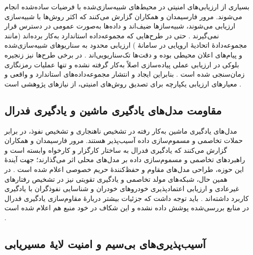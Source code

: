 \documentclass[12pt,a4paper]{article}
\begin{document}
بسیاری از ارزیابی‌های امنیتی در محیط‌های شبیه‌سازی‌شده با فرضیات ساده‌شده انجام می‌شوند. مرور فارسیمدان و همکاران گزارش می‌کنند که اکثر روش‌ها با شبیه‌سازی ارزیابی می‌شوند، شبیه‌سازها ضیف‌اند و داده‌ها به‌صورت عمومی در دسترس قرار نمی‌گیرند \cite{farsimadanReviewSecurityChallenges2025}. حتی در طرح‌هایی که مجموعه‌داده استاندارد به‌کار برده‌اند (مانند مجموعه‌دادهٔ  اتحادیهٔ اروپایی در سامانهٔ ) ارزیابی محدود به سناریو‌های شبیه‌سازی‌شده و پیام‌های اعلان محیطی بوده و دقت‌ها تک‌سناریویی‌اند \cite{feraudoDIVADIDbasedReputation2024}. در برخی طرح‌ها نیز زنجیره بلوکی در ارزیابی عملی پیاده‌سازی اصلاً به‌کار گرفته نشده و تنها عملیات رمزنگاری زمان‌سنجی شده است \cite{mariaBAIVEfficientBlockchainBased2022}. بنابراین ایجاد و انتشار مجموعه‌داده‌های استاندارد و واقعی و معیار‌های ارزیابی یکپارچه برای تصدیق روش‌های امنیتی، از نیاز‌های پژوهشی است \cite{farsimadanReviewSecurityChallenges2025}.

\subsection{مقاومت مدل‌های یادگیری ماشین و یادگیری فدرال}

مدل‌های یادگیری ماشین به‌کار رفته در تشخیص ناهنجاری و تشخیص نفوذ، در برابر حملات تخاصمی و مسموم‌سازی داده  آسیب‌پذیر هستند. مرور فارسیمدان و همکاران گزارش می‌کنند که یادگیری فدرال به ساختار کارگزار و کارخواه وابسته است و راهبرد‌های تخاصمی و مسموم‌سازی داده بر مدل‌های محلی اثر می‌گذارند؛ جهت آیندهٔ این حوزه، طراحی مدل‌های مقاوم و حفظ‌کنندهٔ حریم خصوصی اعلام شده است \cite{farsimadanReviewSecurityChallenges2025}. در همین حال، شبکه‌های مولد تخاصمی  و یادگیری تقویتی نیز در تشخیص رفتار‌های غیرعادی و ارزیابی اعتمادپذیری خودرو‌های خودران و شناسایی نفوذگران با یادگیری  کاربرد داشته‌اند \cite{farsimadanReviewSecurityChallenges2025}. باید توجه داشت که جزئیات بیشتر دربارهٔ مقاوم‌سازی یادگیری فدرال در منابع بررسی‌شده پوشش داده نشده و این شکاف در خود منبع هم اعلام شده است \cite{farsimadanReviewSecurityChallenges2025}.

\subsection{آسیب‌پذیری‌های بی‌سیم و امنیت لایهٔ مسیریابی}
\end{document}

